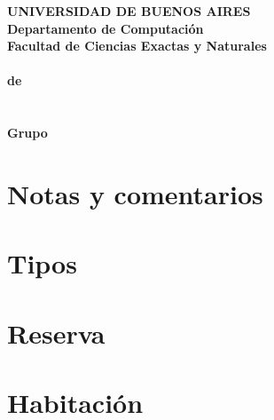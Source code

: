 \documentclass[a4paper]{article}
\begin{document}
\begin{center}
	{\textbf{\large UNIVERSIDAD DE BUENOS AIRES}}\\[1.5em]
	{\textbf{\large Departamento de Computaci\'{o}n}}\\[1.5em]
    {\textbf{\large Facultad de Ciencias Exactas y Naturales}}\\
    \vspace{20mm}
    {\LARGE\textbf{\Materia}}\\[1em]    
    \vspace{5mm}
    {\LARGE\textbf{\cuatrimestreLindo de \elanio}}\\
    \vspace{15mm}
    {\Large \textbf{\Titulo}}\\[1em]
    \vspace{15mm}
    {\textbf{\Large \Fecha}}\\
    \vspace{15mm}
    {\textbf{\Large Grupo \Grupo}}\\
    \vspace{10mm}
    \textbf{\tablaints}
\end{center}



\newpage

\tableofcontents

\medskip

\newpage

\section{Notas y comentarios}

\newpage

\section{Tipos}

\vspace{0.5cm}

\section{Reserva}

\vspace{0.5cm}

\section{Habitaci\'on}

\end{document}
